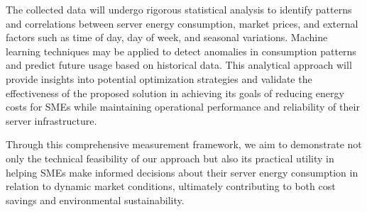 The collected data will undergo rigorous statistical analysis to identify patterns and correlations
between server energy consumption, market prices, and external factors such as time of day, day of
week, and seasonal variations. Machine learning techniques may be applied to detect anomalies in
consumption patterns and predict future usage based on historical data. This analytical approach
will provide insights into potential optimization strategies and validate the effectiveness of the
proposed solution in achieving its goals of reducing energy costs for SMEs while maintaining
operational performance and reliability of their server infrastructure.

Through this comprehensive measurement framework, we aim to demonstrate not only the technical
feasibility of our approach but also its practical utility in helping SMEs make informed decisions
about their server energy consumption in relation to dynamic market conditions, ultimately
contributing to both cost savings and environmental sustainability.

